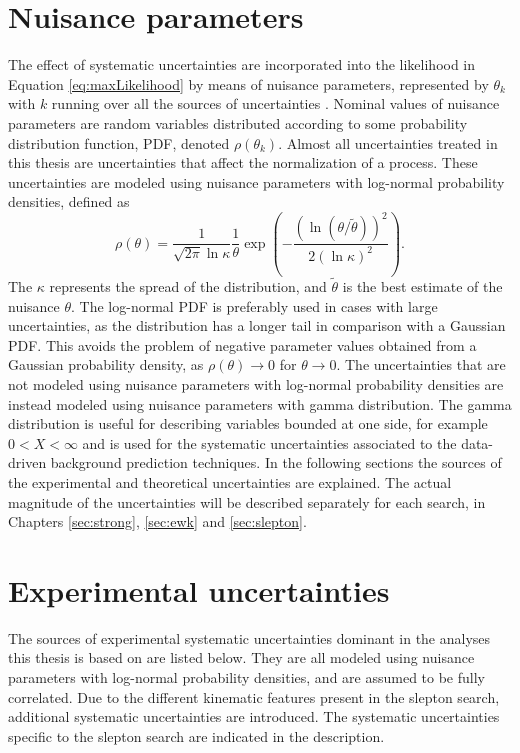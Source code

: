 \section{Nuisance parameters}
\noindent\justify
The effect of systematic uncertainties are incorporated into the likelihood in Equation \ref{eq:maxLikelihood} by means of nuisance parameters, represented by $\theta_{k}$ with $k$ running over all the sources of uncertainties \cite{Lista:2016chp}.
Nominal values of nuisance parameters are random variables distributed according to some probability distribution function, PDF, denoted $\rho(\theta_{k})$. 
Almost all uncertainties treated in this thesis are uncertainties that affect the normalization of a process. 
These uncertainties are modeled using nuisance parameters with log-normal probability densities, defined as
\begin{equation}
\rho(\theta)=\frac{1}{\sqrt{2\pi}\ln \kappa }\frac{1}{\theta}\exp\left(-\frac{(\ln(\theta/\tilde{\theta}))^{2}}{2(\ln \kappa)^{2}}\right).
\end{equation}   
The $\kappa$ represents the spread of the distribution, and $\tilde{\theta}$ is the best estimate of the nuisance $\theta$. 
The log-normal PDF is preferably used in cases with large uncertainties, as the distribution has a longer tail in comparison with a Gaussian PDF. 
This avoids the problem of negative parameter values obtained from a Gaussian probability density, as $\rho(\theta)\rightarrow0$ for $\theta\rightarrow0$.
The uncertainties that are not modeled using nuisance parameters with log-normal probability densities are instead modeled using nuisance parameters with gamma distribution.
The gamma distribution is useful for describing variables bounded at one side, for example $0<X<\infty$ and is used for the systematic uncertainties associated to the data-driven background prediction techniques. 
\newpara
\noindent\justify
In the following sections the sources of the experimental and theoretical uncertainties are explained. 
The actual magnitude of the uncertainties will be described separately for each search, in Chapters \ref{sec:strong}, \ref{sec:ewk} and \ref{sec:slepton}. 
\section{Experimental uncertainties}
\noindent\justify
The sources of experimental systematic uncertainties dominant in the analyses this thesis is based on are listed below. 
They are all modeled using nuisance parameters with log-normal probability densities, and are assumed to be fully correlated. 
Due to the different kinematic features present in the slepton search, additional systematic uncertainties are introduced. 
The systematic uncertainties specific to the slepton search are indicated in the description. 
